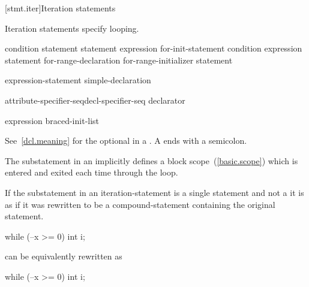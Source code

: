 [stmt.iter]{Iteration statements}%

\pnum
Iteration statements specify looping.

%
%
%
%
\begin{bnf}
\br
     condition \terminal{)} statement\br
     statement  expression \terminal{) ;}\br
     for-init-statement condition\opt \terminal{;} expression\opt \terminal{)} statement\br
     for-range-declaration \terminal{:} for-range-initializer \terminal{)} statement
\end{bnf}

\begin{bnf}
\br
    expression-statement\br
    simple-declaration
\end{bnf}

\begin{bnf}
\br
    attribute-specifier-seq\opt decl-specifier-seq declarator
\end{bnf}

\begin{bnf}
\br
    expression\br
    braced-init-list
\end{bnf}

See~\ref{dcl.meaning} for the optional  in a
.
\enternote
A  ends with a semicolon.
\exitnote

\pnum
The substatement in an  implicitly defines
a block scope~(\ref{basic.scope}) which is entered and exited each time
through the loop.

%
If the substatement in an iteration-statement is a single statement and
not a  it is as if it was rewritten to be
a compound-statement containing the original statement.
\enterexample

\begin{codeblock}
while (--x >= 0)
  int i;
\end{codeblock}

can be equivalently rewritten as

\begin{codeblock}
while (--x >= 0) {
  int i;
}
\end{codeblock}

